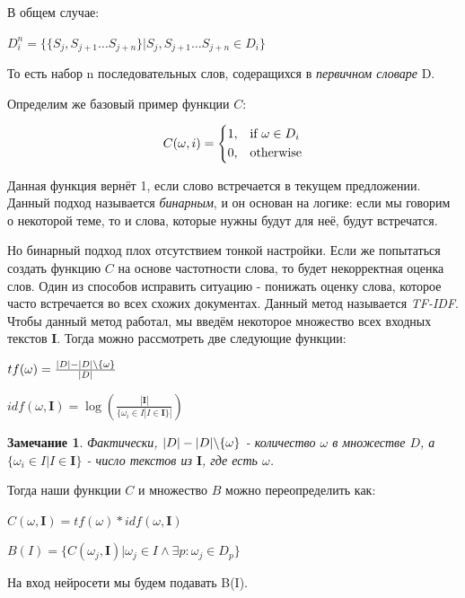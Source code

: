 \documentclass[12pt]{extarticle}
\newtheorem*{remark}{Замечание}
\begin{document}
	В общем случае:
	
	\centerline{$D^n_i = \{\{S_j, S_{j+1} \dots S_{j+n} \} | S_j, S_{j+1} \dots S_{j+n} \in D_i\}$}  
	
	То есть набор n последовательных слов, содеращихся в \textit{первичном словаре} D. 
	
	Определим же базовый пример функции $C$:
	
	\[
    C(\omega, i)= 
	\begin{dcases}
    	1,& \text{if } \omega \in D_i \\
    	0,              & \text{otherwise}
	\end{dcases}
	\]
	
	Данная функция вернёт 1, если слово встречается в текущем предложении. Данный подход называется \textit{бинарным}, и он основан на логике: если мы говорим о некоторой теме, то и слова, которые нужны будут для неё, будут встречатся.
	
	Но бинарный подход плох отсутствием тонкой настройки. Если же попытаться создать функцию $C$ на основе частотности слова, то будет некорректная оценка слов. Один из способов исправить ситуацию - понижать оценку слова, которое часто встречается во всех схожих документах. Данный метод называется \textit{TF-IDF}. 
	Чтобы данный метод работал, мы введём некоторое множество всех входных текстов $\mathbf{I}$. Тогда можно рассмотреть две следующие функции:
	
	\centerline{$tf(\omega) = \frac{|D| - |D|\symbol{92}\{\omega\}}{|D|}$}
	
	\centerline{$idf(\omega, \mathbf{I}) = \log(\frac{|\mathbf{I}|}{
	\{\omega_i \in I | I \in \mathbf{I} \}|})$}
	
	\begin{remark}
	Фактически, $|D| - |D|\symbol{92}\{\omega\}$ - количество $\omega$ в множестве $D$, а $\{\omega_i \in I | I \in \mathbf{I} \}$ - число текстов из $\mathbf{I}$, где есть $\omega$.
	\end{remark}
	
	Тогда наши функции $C$ и множество $B$ можно переопределить как: 
	
	\centerline{$C(\omega, \mathbf{I}) = tf(\omega) * idf(\omega, \mathbf{I})$}
	
	\centerline{$B(I) = \{C(\omega_j, \mathbf{I}) | \omega_j \in I \land \exists p: \omega_j \in D_p \} $}
	
	На вход нейросети мы будем подавать B(I).
	
	\newpage	
{}
 
\end{document}
